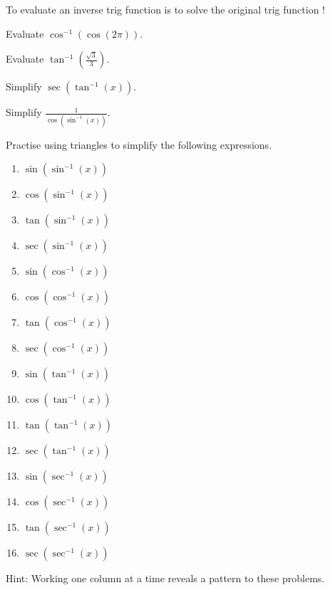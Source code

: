 \documentclass[../main.tex]{subfiles}
\begin{document}
To evaluate an inverse trig function is to solve the original trig function !

\begin{example}
  Evaluate \(\cos^{-1}(\cos(2\pi))\). 

\end{example}

\begin{exercise}
  Evaluate \(\tan^{-1}\left(\frac{\sqrt{3}}{3}\right)\).

\end{exercise}

\begin{example} \label{eg:trig-sec-arctan}
  Simplify \(\sec(\tan^{-1}(x))\).   
\end{example}

\begin{exercise} \label{eg:trig-sec-arctan}
  Simplify \(\frac{1}{\cos(\sin^{-1}(x))}\).   
\end{exercise}
\clearpage


\begin{exercise}
  Practise using triangles to simplify the following expressions.   \newline

  \begin{multicols}{4}
    \begin{enumerate}
      \item \(\sin(\sin^{-1}(x))\)
      \item \(\cos(\sin^{-1}(x))\)
      \item \(\tan(\sin^{-1}(x))\)
      \item \(\sec(\sin^{-1}(x))\)
      \item \(\sin(\cos^{-1}(x))\)
      \item \(\cos(\cos^{-1}(x))\)
      \item \(\tan(\cos^{-1}(x))\)
      \item \(\sec(\cos^{-1}(x))\)
      \item \(\sin(\tan^{-1}(x))\)
      \item \(\cos(\tan^{-1}(x))\)
      \item \(\tan(\tan^{-1}(x))\)
      \item \(\sec(\tan^{-1}(x))\)
      \item \(\sin(\sec^{-1}(x))\)
      \item \(\cos(\sec^{-1}(x))\)
      \item \(\tan(\sec^{-1}(x))\)
      \item \(\sec(\sec^{-1}(x))\)
    \end{enumerate}
  \end{multicols}

  {\footnotesize Hint: Working one column at a time reveals a pattern to these problems.}
\end{exercise}
\clearpage
\end{document}
